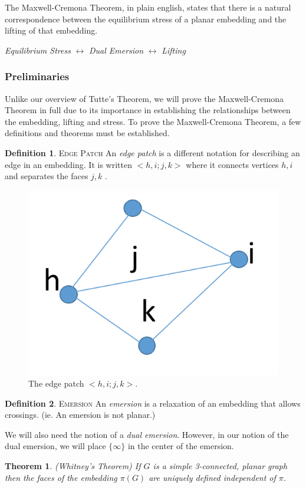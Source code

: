 \documentclass[11pt]{article}
\newtheorem{theorem}{Theorem}[section]
\theoremstyle{definition}
\newtheorem{definition}{Definition}[section]
\begin{document}
 	The Maxwell-Cremona Theorem, in plain english, states that there is a natural correspondence between the equilibrium stress of a planar embedding and the lifting of that embedding.
 
 
 	\emph{Equilibrium Stress} $\leftrightarrow$ \emph{Dual Emersion} $\leftrightarrow$ \emph{Lifting}
	
	\subsubsection{Preliminaries}
	Unlike our overview of Tutte's Theorem, we will prove the Maxwell-Cremona Theorem in full due to its importance in establishing the relationships between the embedding, lifting and stress. 
	To prove the Maxwell-Cremona Theorem, a few definitions and theorems must be established. 
	\theoremstyle{definition}
	\begin{definition}{\textsc{Edge Patch}}
		An \emph{edge patch} is a different notation for describing an edge in an embedding. 
		It is written $<h,i;j,k>$ where it connects vertices $h,i$ and separates the faces $j,k$ \cite{mccProof}.
	\end{definition}
	
		\begin{figure}[h]
  		\begin{center}
  			\includegraphics[width=.3\textwidth]{edge_patch2}
  		\end{center}
  		\caption{The edge patch $<h,i;j,k>$.}
	\end{figure}
	
	\theoremstyle{definition}
	\begin{definition}{\textsc{Emersion}}
		An \emph{emersion} is a relaxation of an embedding that allows crossings. (ie. An emersion is not planar.)
	\end{definition}
	
	We will also need the notion of a \emph{dual emersion}. However, in our notion of the dual emersion, we will place $\{\infty\}$ in the center of the emersion.
	
	\begin{theorem}{(Whitney's Theorem)}
		If $G$ is a simple 3-connected, planar graph then the faces of the embedding $\pi(G)$ are uniquely defined independent of $\pi$.
	\end{theorem}
	
\end{document}
